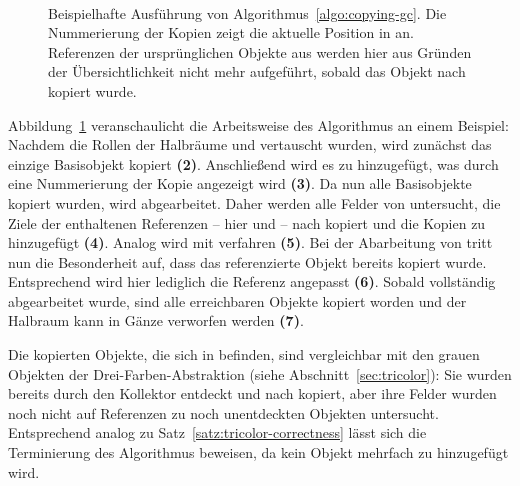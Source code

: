 \begin{figure}[h]
	\centering
	\\[1cm]
	\\[1cm]
	\\[1cm]
	\\[1cm]
	\\[1cm]
	\\[1cm]
	
	\caption[Ausführung der kopierenden Garbage Collection]{Beispielhafte Ausführung von Algorithmus~\ref{algo:copying-gc}. Die Nummerierung der Kopien zeigt die aktuelle Position in  an. Referenzen der ursprünglichen Objekte aus  werden hier aus Gründen der Übersichtlichkeit nicht mehr aufgeführt, sobald das Objekt nach  kopiert wurde.}
	\label{fig:fenichel-example}
\end{figure}

Abbildung~\ref{fig:fenichel-example} veranschaulicht die Arbeitsweise des Algorithmus an einem Beispiel:
Nachdem die Rollen der Halbräume  und  vertauscht wurden, wird zunächst das einzige Basisobjekt  kopiert \textbf{(2)}.
Anschließend wird es zu  hinzugefügt, was durch eine Nummerierung der Kopie  angezeigt wird \textbf{(3)}.
Da nun alle Basisobjekte kopiert wurden, wird  abgearbeitet.
Daher werden alle Felder von  untersucht, die Ziele der enthaltenen Referenzen -- hier  und  -- nach  kopiert und die Kopien zu  hinzugefügt \textbf{(4)}.
Analog wird mit  verfahren \textbf{(5)}.
Bei der Abarbeitung von  tritt nun die Besonderheit auf, dass das referenzierte Objekt  bereits kopiert wurde.
Entsprechend wird hier lediglich die Referenz angepasst \textbf{(6)}.
Sobald  vollständig abgearbeitet wurde, sind alle erreichbaren Objekte kopiert worden und der Halbraum  kann in Gänze verworfen werden \textbf{(7)}.

Die kopierten Objekte, die sich in  befinden, sind vergleichbar mit den grauen Objekten der Drei-Farben-Abstraktion (siehe Abschnitt~\ref{sec:tricolor}):
Sie wurden bereits durch den Kollektor entdeckt und nach  kopiert, aber ihre Felder wurden noch nicht auf Referenzen zu noch unentdeckten Objekten untersucht.
Entsprechend analog zu Satz~\ref{satz:tricolor-correctness} lässt sich die Terminierung des Algorithmus beweisen, da kein Objekt mehrfach zu  hinzugefügt wird.

